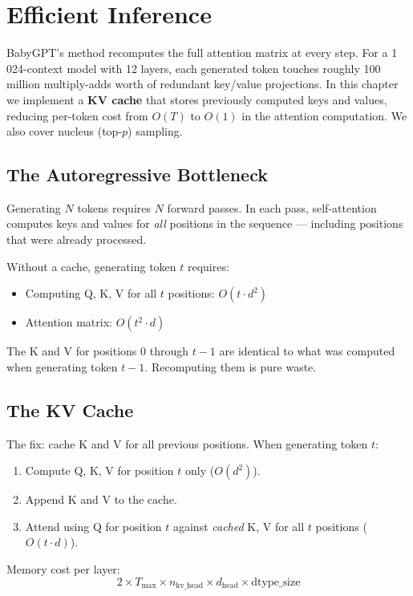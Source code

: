 \chapter{Efficient Inference}
\label{ch:inference}

BabyGPT's  method recomputes the full attention matrix at every step.  For a 1\,024-context model with 12 layers, each generated token touches roughly 100 million multiply-adds worth of redundant key/value projections.  In this chapter we implement a \textbf{KV cache} that stores previously computed keys and values, reducing per-token cost from $O(T)$ to $O(1)$ in the attention computation.  We also cover nucleus (top-$p$) sampling.


\section{The Autoregressive Bottleneck}

Generating $N$ tokens requires $N$ forward passes.  In each pass, self-attention computes keys and values for \emph{all} positions in the sequence --- including positions that were already processed.

Without a cache, generating token $t$ requires:
\begin{itemize}
  \item Computing Q, K, V for all $t$ positions: $O(t \cdot d^2)$
  \item Attention matrix: $O(t^2 \cdot d)$
\end{itemize}

The K and V for positions $0$ through $t{-}1$ are identical to what was computed when generating token $t{-}1$.  Recomputing them is pure waste.


\section{The KV Cache}

The fix: cache K and V for all previous positions.  When generating token $t$:
\begin{enumerate}
  \item Compute Q, K, V for position $t$ only ($O(d^2)$).
  \item Append K and V to the cache.
  \item Attend using Q for position $t$ against \emph{cached} K, V for all $t$ positions ($O(t \cdot d)$).
\end{enumerate}

Memory cost per layer:
\[
  2 \times T_{\max} \times n_{\text{kv\_head}} \times d_{\text{head}} \times \text{dtype\_size}
\]

